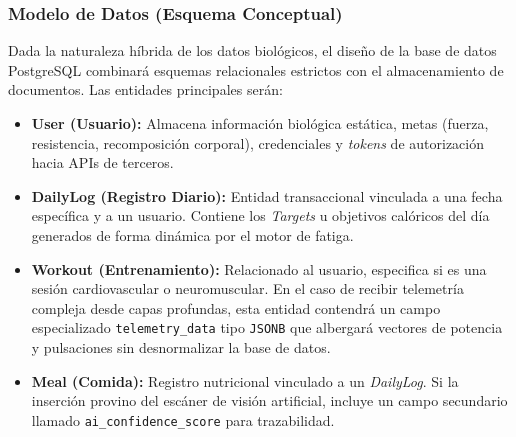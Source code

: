 \documentclass[12pt]{article}
\begin{document}
\begin{center}
\label{fig:interaccion_modulos}
\end{center}
\newpage
\subsubsection{Modelo de Datos (Esquema Conceptual)}
Dada la naturaleza híbrida de los datos biológicos, el diseño de la base de datos PostgreSQL combinará esquemas relacionales estrictos con el almacenamiento de documentos. Las entidades principales serán:
\begin{itemize}
    \item \textbf{User (Usuario):} Almacena información biológica estática, metas (fuerza, resistencia, recomposición corporal), credenciales y \textit{tokens} de autorización hacia APIs de terceros.
    \item \textbf{DailyLog (Registro Diario):} Entidad transaccional vinculada a una fecha específica y a un usuario. Contiene los \textit{Targets} u objetivos calóricos del día generados de forma dinámica por el motor de fatiga.
    \item \textbf{Workout (Entrenamiento):} Relacionado al usuario, especifica si es una sesión cardiovascular o neuromuscular. En el caso de recibir telemetría compleja desde capas profundas, esta entidad contendrá un campo especializado \texttt{telemetry\_data} tipo \texttt{JSONB} que albergará vectores de potencia y pulsaciones sin desnormalizar la base de datos.
    \item \textbf{Meal (Comida):} Registro nutricional vinculado a un \textit{DailyLog}. Si la inserción provino del escáner de visión artificial, incluye un campo secundario llamado \texttt{ai\_confidence\_score} para trazabilidad.
\end{itemize}
\newpage
\end{document}
